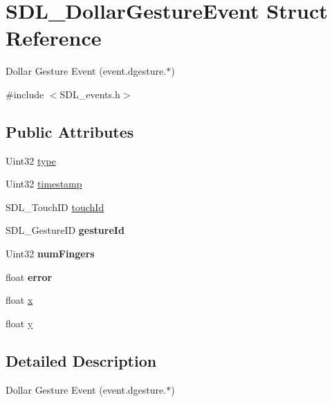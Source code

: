 \hypertarget{struct_s_d_l___dollar_gesture_event}{}\section{S\+D\+L\+\_\+\+Dollar\+Gesture\+Event Struct Reference}
\label{struct_s_d_l___dollar_gesture_event}


Dollar Gesture Event (event.\+dgesture.$\ast$)  




{\ttfamily \#include $<$S\+D\+L\+\_\+events.\+h$>$}

\subsection*{Public Attributes}
\begin{DoxyCompactItemize}
\item 
Uint32 \mbox{\hyperlink{struct_s_d_l___dollar_gesture_event_ac7f6948754a1b2eb36edde043bf75ce9}{type}}
\item 
Uint32 \mbox{\hyperlink{struct_s_d_l___dollar_gesture_event_a3bccd8ebdf30b79c0f4074f6471ec583}{timestamp}}
\item 
S\+D\+L\+\_\+\+Touch\+ID \mbox{\hyperlink{struct_s_d_l___dollar_gesture_event_a40402f6911ed0dba48e6b23aa02bd83d}{touch\+Id}}
\item 
\mbox{\label{struct_s_d_l___dollar_gesture_event_a68968438eae9e58208b14e8c954dec31}} 
S\+D\+L\+\_\+\+Gesture\+ID {\bfseries gesture\+Id}
\item 
\mbox{\label{struct_s_d_l___dollar_gesture_event_a14160d8bad8569f53dd18ed8f64d253f}} 
Uint32 {\bfseries num\+Fingers}
\item 
\mbox{\label{struct_s_d_l___dollar_gesture_event_a30aaa8fe0df93615e6692aa20e9c13eb}} 
float {\bfseries error}
\item 
float \mbox{\hyperlink{struct_s_d_l___dollar_gesture_event_a9888449bd8842ed96494b4db16a6097b}{x}}
\item 
float \mbox{\hyperlink{struct_s_d_l___dollar_gesture_event_a293b2303acc1cfc63c167c5525e6eab5}{y}}
\end{DoxyCompactItemize}


\subsection{Detailed Description}
Dollar Gesture Event (event.\+dgesture.$\ast$) 

